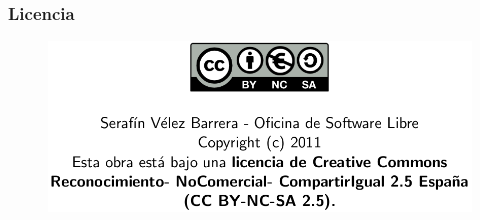 \documentclass{beamer}
\begin{document}
	\begin{frame}
		\frametitle{Licencia}
		\begin{figure}
			\includegraphics[width=\textwidth, height=\textheight, keepaspectratio=true]{./Licencia/LicenciaCC_Autor.png}
		\end{figure}
	\end{frame}
\end{document}
